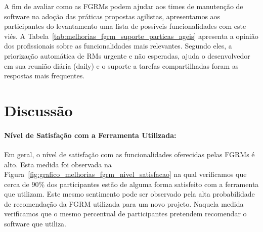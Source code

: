 A fim de avaliar como as FGRMs podem ajudar aos times de manutenção de software
na adoção das práticas propostas agilistas, apresentamos aos participantes do
levantamento uma lista de possíveis funcionalidades com este viés. A
Tabela~\ref{tab:melhorias_fgrm_suporte_particas_ageis} apresenta a opinião dos
profissionais sobre as funcionalidades mais relevantes. Segundo eles, a
priorização automática de RMs urgente e não esperadas, ajuda o desenvolvedor em
sua reunião diária (daily) e o suporte a tarefas compartilhadas foram as
respostas mais frequentes.

\begin{table}[htpb]
\centering
{}
\caption{Classificação das funcionalidades que possam dar suporte ao uso das
metodologias dos agilistas.}
\label{tab:melhorias_fgrm_suporte_particas_ageis}
\end{table}

\section{Discussão}

\paragraph{Nível de Satisfação com a Ferramenta Utilizada:}
\label{par:pesq_profissionais_nivel_de_satisfação}

Em geral, o nível de satisfação com as funcionalidades oferecidas pelas FGRMs é
alto. Esta medida foi observada na
Figura~\ref{fig:grafico_melhorias_fgrm_nivel_satisfacao} na qual verificamos que
cerca de 90\% dos participantes estão de alguma forma satisfeito com a
ferramenta que utilizam. Este mesmo sentimento pode ser observado pela alta
probabilidade de recomendação da FGRM utilizada para um novo projeto. Naquela
medida verificamos que o mesmo percentual de participantes pretendem recomendar
o software que utiliza.

